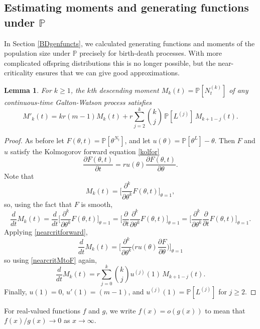 \documentclass{article}
\theoremstyle{plain}
\newtheorem{lem}[thm]{Lemma}
\theoremstyle{definition}
\renewcommand{\P}{\mathbb{P}}
\begin{document}
\subsection{Estimating moments and generating functions under $\P$}

In Section \ref{BDgenfuncts}, we calculated generating functions and moments of the population size under $\P$ precisely for birth-death processes. With more complicated offspring distributions this is no longer possible, but the near-criticality ensures that we can give good approximations.

\begin{lem}\label{genGWmom}
For $k\ge 1$, the $k$th descending moment $M_k(t) = \P[ N_t^{(k)}]$ of any continuous-time Galton-Watson process satisfies
\[M'_k(t)  =  kr(m-1)M_k(t) + r\sum_{j =2 }^k \binom{k}{j}\, \P[L^{(j)}]\, M_{k+1-j}(t).\]
\end{lem}

\begin{proof}
As before let $F(\theta,t) = \P[\theta^{N_t}]$, and let $u(\theta) = \P[\theta^L] - \theta$. Then $F$ and $u$ satisfy the Kolmogorov forward equation \eqref{kolfor}
\begin{equation}\label{nearcritforward}
\frac{\partial F(\theta,t)}{\partial t} = ru(\theta) \frac{\partial F(\theta,t)}{\partial \theta}.
\end{equation}
Note that
\begin{equation}\label{nearcritMtoF}
M_k(t) = \Big[ \frac{\partial^k }{\partial \theta^k} F(\theta,t) \Big]_{\theta=1},
\end{equation}
so, using the fact that $F$ is smooth,
\[\frac{d}{dt} M_k(t) = \frac{d}{dt} \Big[ \frac{\partial^k }{\partial \theta^k} F(\theta,t) \Big]_{\theta=1} = \Big[ \frac{\partial }{\partial t} \frac{\partial^k }{\partial \theta^k} F(\theta,t) \Big]_{\theta=1} = \Big[  \frac{\partial^k }{\partial \theta^k}\frac{\partial }{\partial t} F(\theta,t) \Big]_{\theta=1}.\]
Applying \eqref{nearcritforward},
\[\frac{d}{dt} M_k(t) = \Big[  \frac{\partial^k }{\partial \theta^k} \Big(r u(\theta) \frac{\partial F}{\partial \theta}  \Big) \Big]_{\theta=1}\]
so using \eqref{nearcritMtoF} again,
\[\frac{d}{dt} M_k(t) = r\sum_{j=0}^{k} \binom{k}{j} u^{(j)}(1)\, M_{k+1-j}(t).\]
Finally, $u(1) = 0$, $u'(1) = (m-1)$, and $u^{(j)}(1) = \P[L^{(j)}]$ for $j\ge 2$.
\end{proof}

For real-valued functions $f$ and $g$, we write $f(x) = o(g(x))$ to mean that $f(x)/g(x)\to 0$ as $x\to\infty$.
\end{document}
